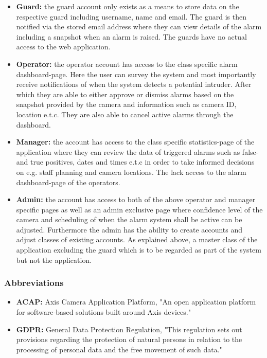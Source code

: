\documentclass{article}
\begin{document}
\begin{itemize}

    \item \textbf{Guard:} the guard account only exists as a means to store data on the respective guard including username, name and email. The guard is then notified via the stored email address where they can view details of the alarm including a snapshot when an alarm is raised. The guards have no actual access to the web application.
    
    \item \textbf{Operator:} the operator account has access to the class specific alarm dashboard-page. Here the user can survey the system and most importantly receive notifications of when the system detects a potential intruder. After which they are able to either approve or dismiss alarms based on the snapshot provided by the camera and information such as camera ID, location e.t.c. They are also able to cancel active alarms through the dashboard.
    
    \item \textbf{Manager:} the account has access to the class specific statistics-page of the application where they can review the data of triggered alarms such as false- and true positives, dates and times e.t.c in order to take informed decisions on e.g. staff planning and camera locations. The lack access to the alarm dashboard-page of the operators.
    
    \item \textbf{Admin:} the account has access to both of the above operator and manager specific pages as well as an admin exclusive page where confidence level of the camera and scheduling of when the alarm system shall be active can be adjusted. Furthermore the admin has the ability to create accounts and adjust classes of existing accounts. As explained above, a master class of the application excluding the guard which is to be regarded as part of the system but not the application.
    
\end{itemize}


\subsubsection{Abbreviations}

\begin{itemize}
   \item \textbf{ACAP:} Axis Camera Application Platform, "An open application platform for software-based solutions built around Axis devices." \cite{ACAP}
     \item \textbf{GDPR:} General Data Protection Regulation,
"This regulation sets out provisions regarding the protection of natural persons in relation to the processing of personal data and the free movement of such data." \cite{GDPR}
\end{itemize}
\end{document}
